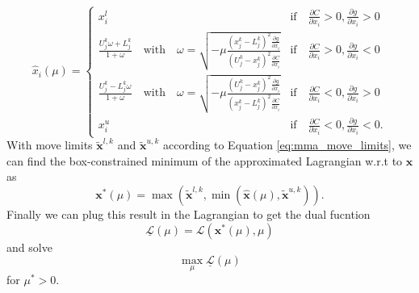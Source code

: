 \begin{equation}
    \hat{x}_i (\mu) = 
    \begin{cases}
        x^l_i 
            &\textrm{if} \quad \frac{\partial C}{\partial x_i} > 0, \frac{\partial g}{\partial x_i} > 0 \\
        \frac{U_j^k\omega + L_j^k}{1+\omega} \quad \text{with} \quad \omega = \sqrt{-\mu\frac{(x_j^k-L_j^k)^2\frac{\partial g}{\partial x_i}}{(U_j^k-x_j^k)^2\frac{\partial C}{\partial x_i}}}
            &\textrm{if} \quad \frac{\partial C}{\partial x_i}  > 0, \frac{\partial g}{\partial x_i} <0\\
        \frac{U_j^k-L_j^k\omega}{1+\omega} \quad \text{with} \quad \omega = \sqrt{-\mu\frac{(U_j^k-x_j^k)^2\frac{\partial g}{\partial x_i}}{(x_j^k-L_j^k)^2\frac{\partial C}{\partial x_i}}} 
            &\textrm{if} \quad \frac{\partial C}{\partial x_i} < 0, \frac{\partial g}{\partial x_i}  > 0\\
        x^u_i 
            &\textrm{if} \quad \frac{\partial C}{\partial x_i}< 0, \frac{\partial g}{\partial x_i} < 0.
    \end{cases}
\end{equation}
With move limits $\tilde{\mathbf{x}}^{l,k}$ and $\tilde{\mathbf{x}}^{u,k}$ according to Equation \eqref{eq:mma_move_limits}, we can find the box-constrained minimum of the approximated Lagrangian w.r.t to $\mathbf{x}$ as
\begin{equation}
    \mathbf{x}^*(\mu) = \max\left(\tilde{\mathbf{x}}^{l,k}, \min \left(\hat{\mathbf{x}}(\mu), \tilde{\mathbf{x}}^{u,k} \right)\right).
\end{equation}
Finally we can plug this result in the Lagrangian to get the dual fucntion 
\begin{equation}
    \underline{\mathcal{L}}(\mu) = \mathcal{L}(\mathbf{x}^* (\mu), \mu)
\end{equation}
and solve 
\begin{equation}
    \max_{\mu} \underline{\mathcal{L}}(\mu)
\end{equation}
for $\mu^*>0$. 

